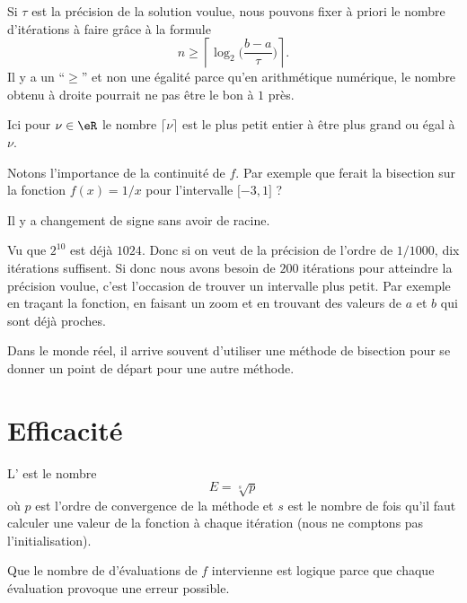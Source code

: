 Si \( \tau\) est la précision de la solution voulue, nous pouvons fixer à priori le nombre d'itérations à faire grâce à la formule
\begin{equation}
	n\geq\left\lceil  \log_2\big( \frac{ b-a }{ \tau } \big)  \right\rceil.
\end{equation}
Il y a un ``\( \geq\)'' et non une égalité parce qu'en arithmétique numérique, le nombre obtenu à droite pourrait ne pas être le bon à \( 1\) près.

Ici pour \( \nu\in \eR\) le nombre \( \lceil\nu\rceil\) est le plus petit entier à être plus grand ou égal à \( \nu\).

\begin{normaltext}
	Notons l'importance de la continuité de \( f\). Par exemple que ferait la bisection sur la fonction \( f(x)=1/x\) pour l'intervalle \( \mathopen[ -3 , 1 \mathclose]\) ?

	Il y a changement de signe sans avoir de racine.
\end{normaltext}

Vu que \( 2^{10}\) est déjà \( 1024\). Donc si on veut de la précision de l'ordre de \( 1/1000\), dix itérations suffisent. Si donc nous avons besoin de \( 200\) itérations pour atteindre la précision voulue, c'est l'occasion de trouver un intervalle plus petit. Par exemple en traçant la fonction, en faisant un zoom et en trouvant des valeurs de \( a\) et \( b\) qui sont déjà proches.


\begin{normaltext}
	Dans le monde réel, il arrive souvent d'utiliser une méthode de bisection pour se donner un point de départ pour une autre méthode.
\end{normaltext}

\section{Efficacité}

\begin{definition}
	L' est le nombre
	\begin{equation}
		E=\sqrt[s]{ p }
	\end{equation}
	où \( p\) est l'ordre de convergence de la méthode et \( s\) est le nombre de fois qu'il faut calculer une valeur de la fonction à chaque itération (nous ne comptons pas l'initialisation).
\end{definition}
Que le nombre de d'évaluations de \( f\) intervienne est logique parce que chaque évaluation provoque une erreur possible.

